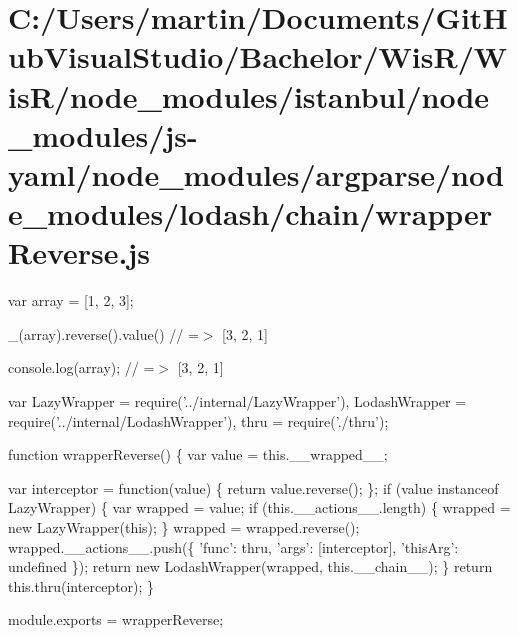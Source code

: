 \hypertarget{_c_1_2_users_2martin_2_documents_2_git_hub_visual_studio_2_bachelor_2_wis_r_2_wis_r_2node_module03abbf41928ce1f85d0119c192718c80}{}\section{C\+:/\+Users/martin/\+Documents/\+Git\+Hub\+Visual\+Studio/\+Bachelor/\+Wis\+R/\+Wis\+R/node\+\_\+modules/istanbul/node\+\_\+modules/js-\/yaml/node\+\_\+modules/argparse/node\+\_\+modules/lodash/chain/wrapper\+Reverse.\+js}
var array = \mbox{[}1, 2, 3\mbox{]};

\+\_\+(array).reverse().value() // =$>$ \mbox{[}3, 2, 1\mbox{]}

console.\+log(array); // =$>$ \mbox{[}3, 2, 1\mbox{]}


\begin{DoxyCodeInclude}
var LazyWrapper = require(\textcolor{stringliteral}{'../internal/LazyWrapper'}),
    LodashWrapper = require(\textcolor{stringliteral}{'../internal/LodashWrapper'}),
    thru = require(\textcolor{stringliteral}{'./thru'});

\textcolor{keyword}{function} wrapperReverse() \{
  var value = this.\_\_wrapped\_\_;

  var interceptor = \textcolor{keyword}{function}(value) \{
    \textcolor{keywordflow}{return} value.reverse();
  \};
  \textcolor{keywordflow}{if} (value instanceof LazyWrapper) \{
    var wrapped = value;
    \textcolor{keywordflow}{if} (this.\_\_actions\_\_.length) \{
      wrapped = \textcolor{keyword}{new} LazyWrapper(\textcolor{keyword}{this});
    \}
    wrapped = wrapped.reverse();
    wrapped.\_\_actions\_\_.push(\{ \textcolor{stringliteral}{'func'}: thru, \textcolor{stringliteral}{'args'}: [interceptor], \textcolor{stringliteral}{'thisArg'}: undefined \});
    \textcolor{keywordflow}{return} \textcolor{keyword}{new} LodashWrapper(wrapped, this.\_\_chain\_\_);
  \}
  \textcolor{keywordflow}{return} this.thru(interceptor);
\}

module.exports = wrapperReverse;
\end{DoxyCodeInclude}
 